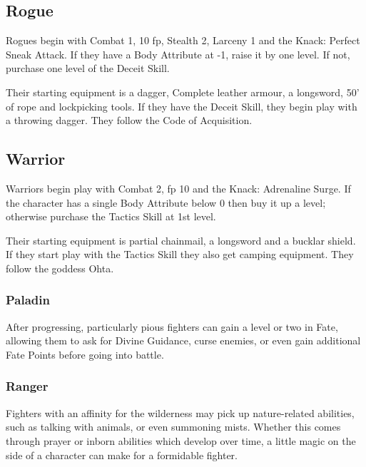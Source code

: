 \documentclass[titlepage,a4paper,openany]{book}
\begin{document}
\begin{multicols}{2}
\subsection{Rogue}

Rogues begin with Combat 1, 10 \gls{fp}, Stealth 2, Larceny 1 and the Knack: Perfect Sneak Attack.
If they have a Body Attribute at -1, raise it by one level.
If not, purchase one level of the Deceit Skill.

Their starting equipment is a dagger, Complete leather armour, a longsword, 50' of rope and lockpicking tools.
If they have the Deceit Skill, they begin play with a throwing dagger.
They follow the Code of Acquisition.

\subsection{Warrior}

Warriors begin play with Combat 2, \gls{fp} 10 and the Knack: Adrenaline Surge.
If the character has a single Body Attribute below 0 then buy it up a level; otherwise purchase the Tactics Skill at 1st level.

Their starting equipment is partial chainmail, a longsword and a bucklar shield.
If they start play with the Tactics Skill they also get camping equipment.
They follow the goddess Ohta.

\subsubsection{Paladin}

After progressing, particularly pious fighters can gain a level or two in Fate, allowing them to ask for Divine Guidance, curse enemies, or even gain additional Fate Points before going into battle.

\subsubsection{Ranger}

Fighters with an affinity for the wilderness may pick up nature-related abilities, such as talking with animals, or even summoning mists.
Whether this comes through prayer or inborn abilities which develop over time, a little magic on the side of a character can make for a formidable fighter.

\end{multicols}
\end{document}

